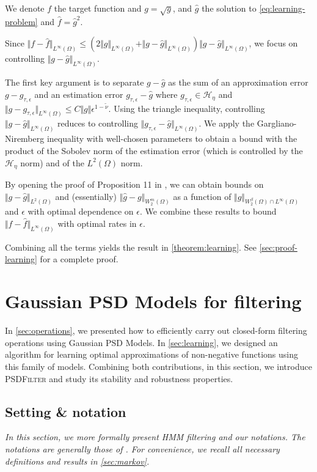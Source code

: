 We denote $f$ the target function and $g = \sqrt{g}$, and $\hat g$ the solution to \cref{eq:learning-problem} and $\hat f = \hat g^2$.

Since $\Vert f - \hat f\Vert_{L^\infty(\Omega)}\leq \left(2\Vert g\Vert_{L^\infty(\Omega)}+ \Vert g - \hat g\Vert_{L^\infty(\Omega)} \right)\Vert g- \hat g\Vert_{L^\infty(\Omega)}$, we focus on controlling $\Vert g - \hat g \Vert_{L^\infty(\Omega)}$.

The first key argument is to separate $g - \hat g$ as the sum of an approximation error $g - g_{\tau, \epsilon}$ and an estimation error $g_{\tau, \epsilon} - \hat g$ where $g_{\tau, \epsilon} \in \mathcal H_\eta$ and $\Vert g - g_{\tau, \epsilon}\Vert_{L^\infty(\Omega)}\leq C \Vert g \Vert \epsilon^{1-\tilde \nu}$. Using the triangle inequality, controlling $\Vert g - \hat g\Vert_{L^\infty(\Omega)}$ reduces to controlling $\Vert g_{\tau, \epsilon} - \hat g\Vert_{L^\infty(\Omega)}$. We apply the Gargliano-Niremberg inequality with well-chosen parameters to obtain a bound with the product of the Sobolev norm of the estimation error (which is controlled by the $\mathcal H_\eta$ norm) and of the $L^2(\Omega)$ norm.

By opening the proof of Proposition 11 in \cite{sampling-ulysse}, we can obtain bounds on $\Vert g - \hat g \Vert_{L^2(\Omega)}$ and (essentially) $\Vert \hat g - g\Vert_{W^m_2(\Omega)}$ as a function of $\Vert g\Vert_{W^\beta_2(\Omega)\cap L^\infty(\Omega)}$ and $\epsilon$ with optimal dependence on $\epsilon$. We combine these results to bound $\Vert f - \hat f\Vert_{L^\infty(\Omega)}$ with optimal rates in $\epsilon$.

Combining all the terms yields the result in \cref{theorem:learning}. See \cref{sec:proof-learning} for a complete proof.

\section{Gaussian PSD Models for filtering}\label{sec:psd-filter-root}
In \cref{sec:operations}, we presented how to efficiently carry out closed-form filtering operations using Gaussian PSD Models. In \cref{sec:learning}, we designed an algorithm for learning optimal approximations of non-negative functions using this family of models. Combining both contributions, in this section, we introduce \textsc{PSDFilter} and study its stability and robustness properties.

\subsection{Setting \& notation}
\emph{In this section, we more formally present HMM filtering and our notations. The notations are generally those of \cite{cappehmm}. For convenience, we recall all necessary definitions and results in \cref{sec:markov}.}


